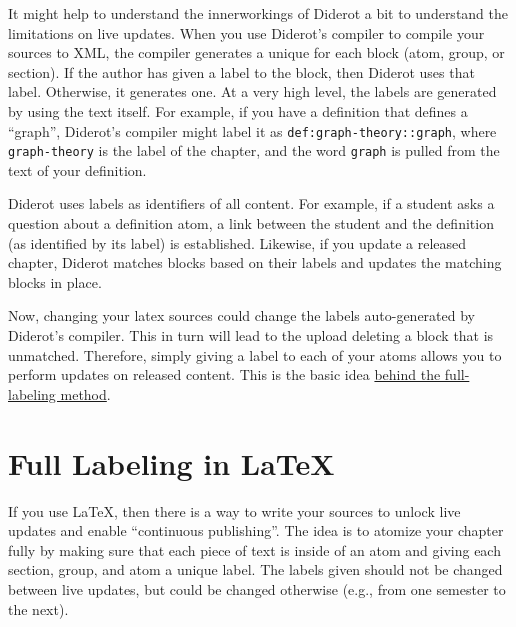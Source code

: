 \begin{gram}
It might help to understand the innerworkings of Diderot a bit to understand the limitations on live updates.
%
When you use Diderot's compiler to compile your sources to XML, the compiler generates a unique  for each block (atom, group, or section).  
%
If the author has given a label to the block, then Diderot uses that label.
%
Otherwise, it generates one.
%
At a very high level, the labels are generated by using the text itself.  For example, if you have a definition that defines a ``graph'', Diderot's compiler might label it as \lstinline`def:graph-theory::graph`, where  
%
\lstinline`graph-theory` is the label of the chapter,
%
and the word \lstinline`graph` is pulled from the text of your definition.
%

Diderot uses labels as identifiers of all content.
%
For example, if a student asks a question about a definition atom, a link between the student and the definition (as identified by its label) is established.  
%
Likewise, if you update a released chapter, Diderot matches blocks based on their labels and updates the matching blocks in place.

Now, changing your latex sources could change the labels auto-generated by Diderot's compiler.  This in turn will lead to the upload deleting a block that is unmatched.
%
Therefore, simply giving a label to each of your atoms allows you to perform updates on released content.
%
This is the basic idea \href{sec:publish::full-labeling}{behind the full-labeling method}.
\end{gram}

\section{Full Labeling in LaTeX}
\label{sec:publish::full-labeling}

\begin{gram}
If you use LaTeX, then there is a way to write your sources to unlock live updates and enable ``continuous publishing''.
%
The idea is to atomize your chapter fully by making sure that each piece of text is inside of an atom and giving each section, group, and atom a unique label.
%
The labels given should not be changed between live updates, but could be changed otherwise (e.g., from one semester to the next).
%
\end{gram}


